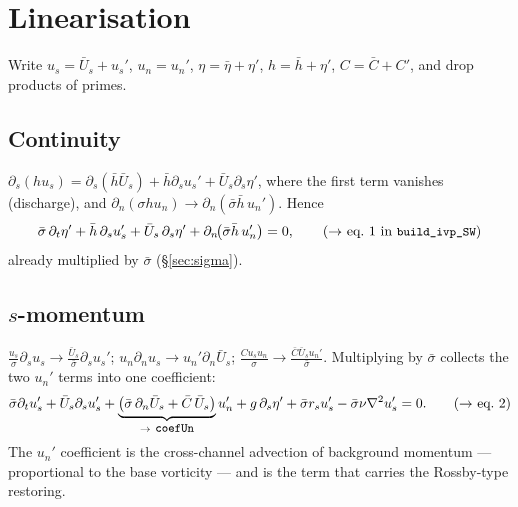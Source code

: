 \documentclass[11pt]{article}
\newcommand{\us}{u_s}
\newcommand{\un}{u_n}
\newcommand{\Us}{\bar U_s}
\newcommand{\ds}{\partial_s}
\newcommand{\dn}{\partial_n}
\newcommand{\dt}{\partial_t}
\newcommand{\code}[1]{\texttt{\small #1}}
\begin{document}
\section{Linearisation}
\label{sec:lin}

Write $\us=\Us+\us'$, $\un=\un'$, $\eta=\bar\eta+\eta'$, $h=\bar h+\eta'$,
$C=\bar C+C'$, and drop products of primes.

\subsection{Continuity}
$\ds(h\us)=\ds(\bar h\Us)+\bar h\ds\us'+\Us\ds\eta'$, where the first term vanishes
(discharge), and $\dn(\sigma h\un)\to\dn(\bar\sigma\bar h\,\un')$. Hence
\begin{equation}
  \bar\sigma\,\dt\eta'+\bar h\,\ds\us'+\Us\,\ds\eta'+\dn\!\big(\bar\sigma\bar h\,\un'\big)=0,
  \tag{$\to$ eq.\ 1 in \code{build\_ivp\_SW}}
\end{equation}
already multiplied by $\bar\sigma$ (\S\ref{sec:sigma}).

\subsection{$s$-momentum}
$\frac{\us}{\sigma}\ds\us\to\frac{\Us}{\bar\sigma}\ds\us'$;
$\un\dn\us\to\un'\dn\Us$;
$\frac{C\us\un}{\sigma}\to\frac{\bar C\Us\un'}{\bar\sigma}$. Multiplying by
$\bar\sigma$ collects the two $\un'$ terms into one coefficient:
\begin{equation}
  \bar\sigma\dt\us'+\Us\ds\us'
  +\underbrace{\big(\bar\sigma\,\dn\Us+\bar C\,\Us\big)}_{\to\ \code{coefUn}}\un'
  +g\,\ds\eta'+\bar\sigma r_s\us'-\bar\sigma\nu\nabla^{2}\us'=0 .
  \tag{$\to$ eq.\ 2}
\end{equation}
The $\un'$ coefficient is the cross-channel advection of background momentum ---
proportional to the base vorticity --- and is the term that carries the
Rossby-type restoring.
\end{document}
